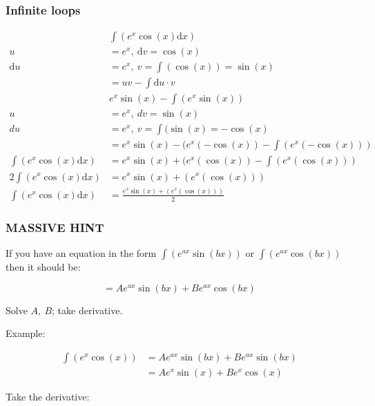 \documentclass[12pt]{article}
\theoremstyle{plain}
\theoremstyle{remark}
\theoremstyle{definition}
\begin{document}
\subsubsection{Infinite loops}

\begin{align*}
&\int\left( e^{x}\cos(x)\text{d}x \right) \\
u &= e^{x},\ \text{d}v = \cos(x) \\
\text{d}u &= e^{x},\ v = \int\left( \cos(x) \right) = \sin(x) \\
&= uv - \int\text{d}u \cdot v \\
&e^{x}\sin(x) - \int\left( e^{x}\sin(x) \right) \\
u &= e^{x},\ dv = \sin(x) \\
du &= e^{x},\ v = \int(\sin(x) = - \cos(x) \\
&= e^{x}\sin(x) - (e^{x}\left( - \cos(x) \right) - \int\left( e^{x}\left( - \cos(x) \right) \right)
 \\
\int\left( e^{x}\cos(x)\text{d}x \right) &= e^{x}\sin(x) + (e^{x}\left( \cos(x) \right) - \int\left( e^{x}\left( \cos(x) \right) \right) \\
2\int\left( e^{x}\cos(x)\text{d}x \right) &= e^{x}\sin(x) + \left( e^{x}\left( \cos(x) \right) \right) \\
\int\left( e^{x}\cos(x)\text{d}x \right) &= \frac{e^{x}\sin(x) + \left( e^{x}\left( \cos(x) \right) \right)}{2}
\end{align*}



\subsubsection{MASSIVE HINT}

If you have an equation in the form
\(\int\left( e^{ax}\sin\left( bx \right) \right)\) or
\(\int\left( e^{ax}\cos\left( bx \right) \right)\) then it
should be:

\[= Ae^{ax}\sin\left( bx \right) + Be^{ax}\cos\left( bx \right)\]

Solve \(A,\ B\); take derivative.

Example:

\begin{align*}
\int\left( e^{x}\cos(x) \right) &= Ae^{ax}\sin\left( bx \right) + Be^{ax}\sin\left( bx \right) \\
&= Ae^{x}\sin(x) + Be^{x}\cos(x)
\end{align*}


Take the derivative:
\end{document}
